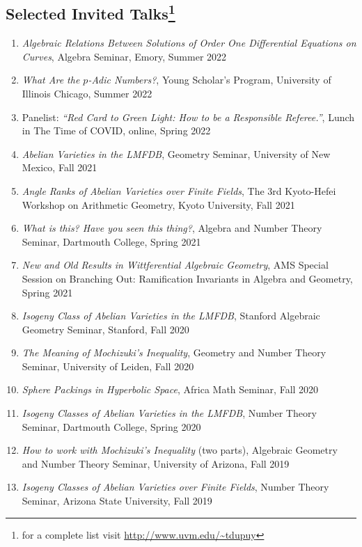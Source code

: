 \documentclass[a4paper,10pt]{article}
\begin{document}
\subsection*{Selected Invited Talks\footnote{ for a complete list visit \url{http://www.uvm.edu/~tdupuy} }} 
\begin{enumerate} %
	\item \emph{Algebraic Relations Between Solutions of Order One Differential Equations on Curves}, Algebra Seminar, Emory, Summer 2022
	\item \emph{What Are the $p$-Adic Numbers?}, Young Scholar’s Program, University of Illinois Chicago, Summer 2022
	\item Panelist: \emph{“Red Card to Green Light: How to be a Responsible Referee.”}, Lunch in The Time of COVID, online, Spring 2022
	\item \emph{Abelian Varieties in the LMFDB}, Geometry Seminar, University of New Mexico, Fall 2021
	\item \emph{Angle Ranks of Abelian Varieties over Finite Fields}, The 3rd Kyoto-Hefei Workshop on Arithmetic Geometry, Kyoto University, Fall 2021
	\item \emph{What is this? Have you seen this thing?}, Algebra and Number Theory Seminar, Dartmouth College, Spring 2021
	\item \emph{New and Old Results in Wittferential Algebraic Geometry}, AMS Special Session on Branching Out: Ramification Invariants in Algebra and Geometry, Spring 2021
	\item \emph{Isogeny Class of Abelian Varieties in the LMFDB}, Stanford Algebraic Geometry Seminar, Stanford, Fall 2020
	\item \emph{The Meaning of Mochizuki’s Inequality}, Geometry and Number Theory Seminar, University of Leiden, Fall 2020
	\item \emph{Sphere Packings in Hyperbolic Space}, Africa Math Seminar, Fall 2020
	\item \emph{Isogeny Classes of Abelian Varieties in the LMFDB}, Number Theory Seminar, Dartmouth College, Spring 2020
	\item \emph{How to work with Mochizuki's Inequality} (two parts), Algebraic Geometry and Number Theory Seminar, University of Arizona, Fall 2019
	\item \emph{Isogeny Classes of Abelian Varieties over Finite Fields}, Number Theory Seminar, Arizona State University, Fall 2019

\end{enumerate}
\end{document}
